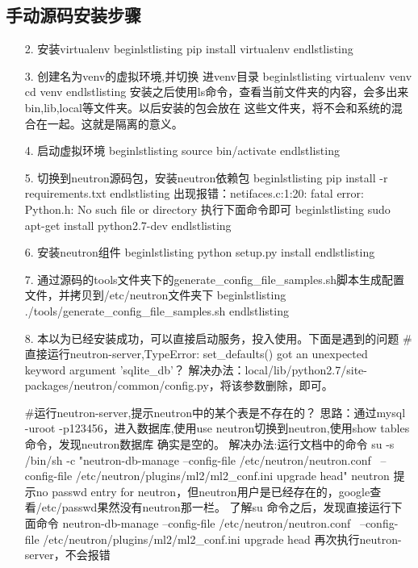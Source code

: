 \documentclass[a4paper,left=1.5cm,right=1.5cm,11pt]{article}
\begin{document}
\subsection{手动源码安装步骤}
    \begin{itemize}
		\item[2.]安装virtualenv
			begin{lstlisting}
				pip install virtualenv
			end{lstlisting}
		\item[3.]创建名为venv的虚拟环境,并切换	进venv目录
			begin{lstlisting}
				virtualenv venv
				cd venv
			end{lstlisting}
			安装之后使用ls命令，查看当前文件夹的内容，会多出来bin,lib,local等文件夹。以后安装的包会放在
			这些文件夹，将不会和系统的混合在一起。这就是隔离的意义。
		\item[4.]启动虚拟环境
			begin{lstlisting}
				source bin/activate
			end{lstlisting}
        \item[5.]切换到neutron源码包，安装neutron依赖包
			begin{lstlisting}
				pip install -r requirements.txt
			end{lstlisting}
			出现报错：netifaces.c:1:20: fatal error: Python.h: No such file or directory
			执行下面命令即可
			begin{lstlisting}
				sudo apt-get install python2.7-dev
			end{lstlisting}
		\item[6.]安装neutron组件
			begin{lstlisting}
				python setup.py install
			end{lstlisting}
		\item[7.]通过源码的tools文件夹下的generate_config_file_samples.sh脚本生成配置文件，并拷贝到/etc/neutron文件夹下
			begin{lstlisting}
				./tools/generate_config_file_samples.sh
			end{lstlisting}	
		\item[8.]本以为已经安装成功，可以直接启动服务，投入使用。下面是遇到的问题
			#直接运行neutron-server,TypeError: set_defaults() got an unexpected keyword argument 'sqlite_db'？
			解决办法：local/lib/python2.7/site-packages/neutron/common/config.py，将该参数删除，即可。

			#运行neutron-server,提示neutron中的某个表是不存在的？
			思路：通过mysql -uroot -p123456，进入数据库,使用use neutron切换到neutron,使用show tables命令，发现neutron数据库
			确实是空的。
			解决办法:运行文档中的命令
			su -s /bin/sh -c "neutron-db-manage --config-file /etc/neutron/neutron.conf \
			--config-file /etc/neutron/plugins/ml2/ml2_conf.ini upgrade head" neutron
			提示no passwd entry for neutron，但neutron用户是已经存在的，google查看/etc/passwd果然没有neutron那一栏。
			了解su 命令之后，发现直接运行下面命令
			neutron-db-manage --config-file /etc/neutron/neutron.conf \
			--config-file /etc/neutron/plugins/ml2/ml2_conf.ini upgrade head
			再次执行neutron-server，不会报错


\end{itemize}
\end{document}
